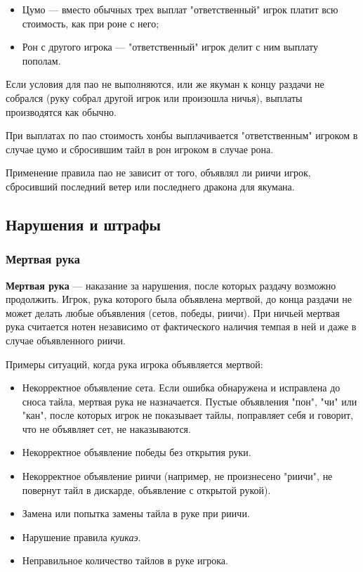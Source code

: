 \begin{itemize}
	\item Цумо --- вместо обычных трех выплат "ответственный" игрок платит всю стоимость, как при роне с него;
	\item Рон с другого игрока --- "ответственный" игрок делит с ним выплату пополам.
\end{itemize}

Если условия для пао не выполняются, или же якуман к концу раздачи не собрался (руку собрал другой игрок или произошла ничья), выплаты производятся как обычно.

При выплатах по пао стоимость хонбы выплачивается "ответственным" игроком в случае цумо и сбросившим тайл в рон игроком в случае рона.

Применение правила пао не зависит от того, объявлял ли риичи игрок, сбросивший последний ветер или последнего дракона для якумана.

\subsection{Нарушения и штрафы}

\subsubsection{Мертвая рука}

\textbf{Мертвая рука} --- наказание за нарушения, после которых раздачу возможно продолжить. Игрок, рука которого была объявлена мертвой, до конца раздачи не может делать любые объявления (сетов, победы, риичи). При ничьей мертвая рука считается нотен независимо от фактического наличия темпая в ней и даже в случае объявленного риичи.

Примеры ситуаций, когда рука игрока объявляется мертвой:

\begin{itemize}
	\item Некорректное объявление сета. Если ошибка обнаружена и исправлена до сноса тайла, мертвая рука не назначается. Пустые объявления "пон", "чи" или "кан", после которых игрок не показывает тайлы, поправляет себя и говорит, что не объявляет сет, не наказываются.
	\item Некорректное объявление победы без открытия руки.
	\item Некорректное объявление риичи (например, не произнесено "риичи", не повернут тайл в дискарде, объявление с открытой рукой).
	\item Замена или попытка замены тайла в руке при риичи.
	\item Нарушение правила \textit{куикаэ}.
	\item Неправильное количество тайлов в руке игрока.
\end{itemize}

